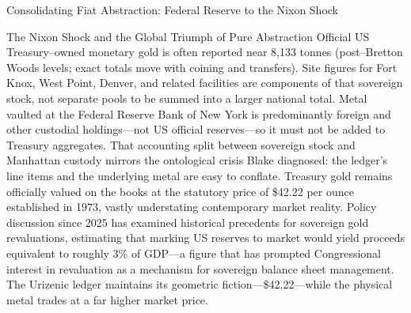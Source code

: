 \documentclass[
  ignorenonframetext,
]{beamer}
\begin{document}
\begin{frame}{Consolidating Fiat Abstraction: Federal Reserve to the
Nixon Shock}
\begin{block}{The Nixon Shock and the Global Triumph of Pure
Abstraction}
Official US Treasury--owned monetary gold is often reported near 8,133
tonnes (post--Bretton Woods levels; exact totals move with coining and
transfers). Site figures for Fort Knox, West Point, Denver, and related
facilities are components of that sovereign stock, not separate pools to
be summed into a larger national total. Metal vaulted at the Federal
Reserve Bank of New York is predominantly foreign and other custodial
holdings---not US official reserves---so it must not be added to
Treasury aggregates. That accounting split between sovereign stock and
Manhattan custody mirrors the ontological crisis Blake diagnosed: the
ledger's line items and the underlying metal are easy to conflate.
Treasury gold remains officially valued on the books at the statutory
price of \$42.22 per ounce established in 1973, vastly understating
contemporary market reality. Policy discussion since 2025 has examined
historical precedents for sovereign gold revaluations, estimating that
marking US reserves to market would yield proceeds equivalent to roughly
3\% of GDP---a figure that has prompted Congressional interest in
revaluation as a mechanism for sovereign balance sheet management. The
Urizenic ledger maintains its geometric fiction---\$42.22---while the
physical metal trades at a far higher market price.
\end{block}
\end{frame}
\end{document}
